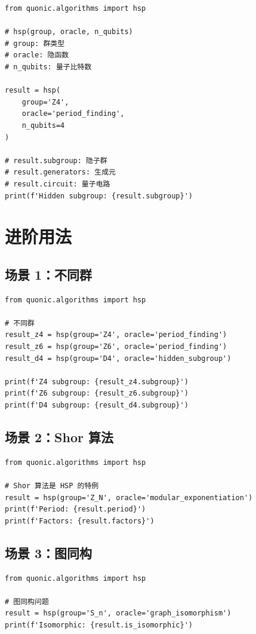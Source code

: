 \documentclass[12pt,a4paper]{article}
\begin{document}
\begin{verbatim}
from quonic.algorithms import hsp

# hsp(group, oracle, n_qubits)
# group: 群类型
# oracle: 隐函数
# n_qubits: 量子比特数

result = hsp(
    group='Z4',
    oracle='period_finding',
    n_qubits=4
)

# result.subgroup: 隐子群
# result.generators: 生成元
# result.circuit: 量子电路
print(f'Hidden subgroup: {result.subgroup}')
\end{verbatim}

\section{进阶用法}

\subsection{场景 1：不同群}

\begin{verbatim}
from quonic.algorithms import hsp

# 不同群
result_z4 = hsp(group='Z4', oracle='period_finding')
result_z6 = hsp(group='Z6', oracle='period_finding')
result_d4 = hsp(group='D4', oracle='hidden_subgroup')

print(f'Z4 subgroup: {result_z4.subgroup}')
print(f'Z6 subgroup: {result_z6.subgroup}')
print(f'D4 subgroup: {result_d4.subgroup}')
\end{verbatim}

\subsection{场景 2：Shor 算法}

\begin{verbatim}
from quonic.algorithms import hsp

# Shor 算法是 HSP 的特例
result = hsp(group='Z_N', oracle='modular_exponentiation')
print(f'Period: {result.period}')
print(f'Factors: {result.factors}')
\end{verbatim}

\subsection{场景 3：图同构}

\begin{verbatim}
from quonic.algorithms import hsp

# 图同构问题
result = hsp(group='S_n', oracle='graph_isomorphism')
print(f'Isomorphic: {result.is_isomorphic}')
\end{verbatim}
\end{document}
